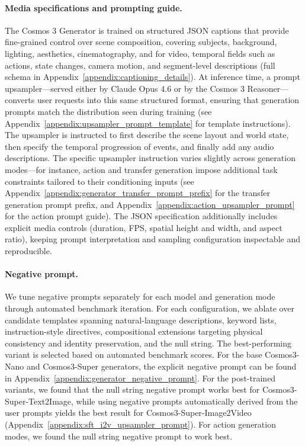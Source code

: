

\paragraph{Media specifications and prompting guide.}
The Cosmos 3 Generator is trained on structured JSON captions that provide fine-grained control over scene composition, covering subjects, background, lighting, aesthetics, cinematography, and for video, temporal fields such as actions, state changes, camera motion, and segment-level descriptions (full schema in Appendix~\ref{appendix:captioning_details}). At inference time, a prompt upsampler---served either by Claude Opus 4.6 or by the Cosmos 3 Reasoner---converts user requests into this same structured format, ensuring that generation prompts match the distribution seen during training (see Appendix~\ref{appendix:upsampler_prompt_template} for template instructions). The upsampler is instructed to first describe the scene layout and world state, then specify the temporal progression of events, and finally add any audio descriptions. The specific upsampler instruction varies slightly across generation modes---for instance, action and transfer generation impose additional task constraints tailored to their conditioning inputs (see Appendix~\ref{appendix:generator_transfer_prompt_prefix} for the transfer generation prompt prefix, and Appendix~\ref{appendix:action_upsampler_prompt} for the action prompt guide). The JSON specification additionally includes explicit media controls (duration, FPS, spatial height and width, and aspect ratio), keeping prompt interpretation and sampling configuration inspectable and reproducible.

\paragraph{Negative prompt.}
We tune negative prompts separately for each model and generation mode through automated benchmark iteration. For each configuration, we ablate over candidate templates spanning natural-language descriptions, keyword lists, instruction-style directives, compositional extensions targeting physical consistency and identity preservation, and the null string. The best-performing variant is selected based on automated benchmark scores. For the base Cosmos3-Nano and Cosmos3-Super generators, the explicit negative prompt can be found in Appendix~\ref{appendix:generator_negative_prompt}. For the post-trained variants, we found that the null string negative prompt works best for Cosmos3-Super-Text2Image, while using negative prompts automatically derived from the user prompts yields the best result for Cosmos3-Super-Image2Video (Appendix~\ref{appendix:sft_i2v_upsampler_prompt}). For action generation modes, we found the null string negative prompt to work best.

